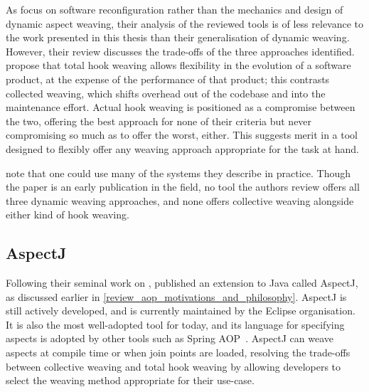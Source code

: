 As \citeauthor{dynamicAOchitchyan} focus on software reconfiguration rather than
the mechanics and design of dynamic aspect weaving, their analysis of the
reviewed tools is of less relevance to the work presented in this thesis than
their generalisation of dynamic weaving. However, their review discusses the
trade-offs of the three approaches identified. \citeauthor{dynamicAOchitchyan}
propose that total hook weaving allows flexibility in the evolution of a
software product, at the expense of the performance of that product; this
contrasts collected weaving, which shifts overhead out of the codebase and into
the maintenance effort. Actual hook weaving is positioned as a compromise
between the two, offering the best approach for none of their criteria but never
compromising so much as to offer the worst, either. This suggests merit in a
tool designed to flexibly offer any weaving approach appropriate for the task at
hand.

\citeauthor{dynamicAOchitchyan} note that one could use many of
the systems they describe in practice. Though the paper is an early publication
in the field, no tool the authors review offers all three dynamic weaving
approaches, and none offers collective weaving alongside either kind of hook
weaving.

\subsection{AspectJ}

Following their seminal work on \aspectorientation{}, \citet{aspectj_intro}
published an \aop{} extension to Java called AspectJ, as discussed earlier in
\cref{review_aop_motivations_and_philosophy}. AspectJ is still actively
developed, and is currently maintained by the Eclipse organisation. It is also
the most well-adopted tool for \aop{} today, and its language for specifying
aspects is adopted by other tools such as Spring
AOP~\cite{introducing_spring_aop_chapter_integration_with_aspectj}. AspectJ can
weave aspects at compile time or when join points are loaded, resolving the
trade-offs between collective weaving and total hook weaving by allowing
developers to select the weaving method appropriate for their use-case.


